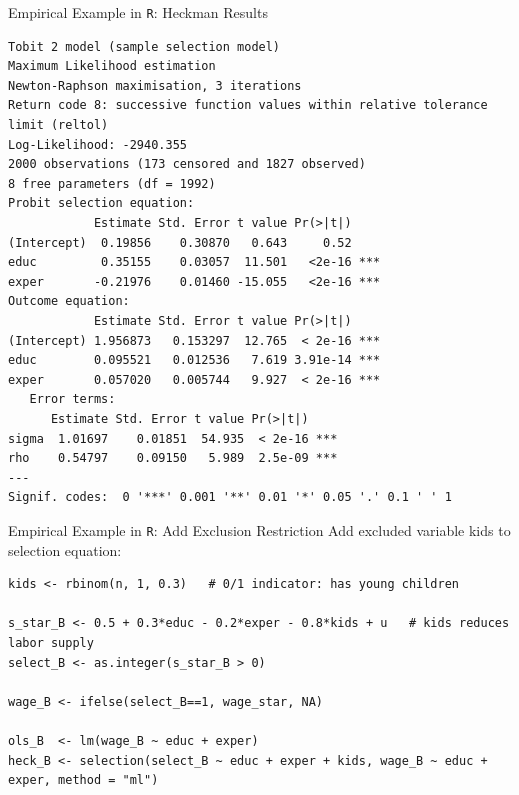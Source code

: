 \documentclass[aspectratio=169,11pt]{beamer}
\begin{document}
\begin{frame}[fragile]{Empirical Example in \texttt{R}: Heckman Results}
\begin{lstlisting}
Tobit 2 model (sample selection model)
Maximum Likelihood estimation
Newton-Raphson maximisation, 3 iterations
Return code 8: successive function values within relative tolerance limit (reltol)
Log-Likelihood: -2940.355 
2000 observations (173 censored and 1827 observed)
8 free parameters (df = 1992)
Probit selection equation:
            Estimate Std. Error t value Pr(>|t|)    
(Intercept)  0.19856    0.30870   0.643     0.52    
educ         0.35155    0.03057  11.501   <2e-16 ***
exper       -0.21976    0.01460 -15.055   <2e-16 ***
Outcome equation:
            Estimate Std. Error t value Pr(>|t|)    
(Intercept) 1.956873   0.153297  12.765  < 2e-16 ***
educ        0.095521   0.012536   7.619 3.91e-14 ***
exper       0.057020   0.005744   9.927  < 2e-16 ***
   Error terms:
      Estimate Std. Error t value Pr(>|t|)    
sigma  1.01697    0.01851  54.935  < 2e-16 ***
rho    0.54797    0.09150   5.989  2.5e-09 ***
---
Signif. codes:  0 '***' 0.001 '**' 0.01 '*' 0.05 '.' 0.1 ' ' 1
\end{lstlisting}
\end{frame}

\begin{frame}[fragile]{Empirical Example in \texttt{R}: Add Exclusion Restriction}
Add excluded variable \alert{kids} to \alert{selection equation}:
\begin{lstlisting}
kids <- rbinom(n, 1, 0.3)   # 0/1 indicator: has young children

s_star_B <- 0.5 + 0.3*educ - 0.2*exper - 0.8*kids + u   # kids reduces labor supply
select_B <- as.integer(s_star_B > 0)

wage_B <- ifelse(select_B==1, wage_star, NA)

ols_B  <- lm(wage_B ~ educ + exper)
heck_B <- selection(select_B ~ educ + exper + kids, wage_B ~ educ + exper, method = "ml")
\end{lstlisting}
\end{frame}
\end{document}

